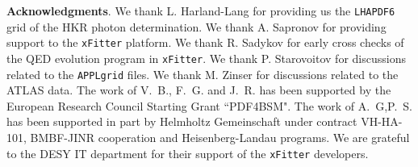 {\bf Acknowledgments}.
%
We thank L. Harland-Lang for providing us the {\tt LHAPDF6} grid of
the HKR photon determination.
%
We thank A. Sapronov for providing support to the {\tt xFitter} platform.
%
We thank R. Sadykov for early cross checks of the QED evolution program in {\tt xFitter}.
%
We thank P. Starovoitov for discussions related to the {\tt APPLgrid} files.
%
We thank M. Zinser for discussions related to the ATLAS data.
% 
The work of V.~B., F.~G. and J.~R. has been supported by the European
Research Council Starting Grant ``PDF4BSM".
%
The work of A.~G,P.~S. has been supported in part by Helmholtz Gemeinschaft
under contract VH-HA-101, BMBF-JINR cooperation and Heisenberg-Landau programs.
%
We are grateful to the DESY IT department for their support of the {\tt xFitter} developers. 



